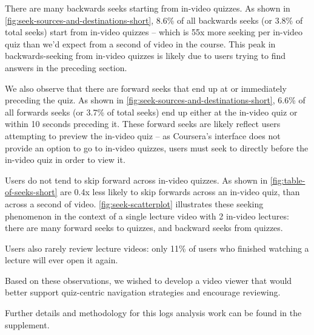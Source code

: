 \documentclass{sigchi}
\begin{document}
There are many backwards seeks starting from in-video quizzes. As shown in \autoref{fig:seek-sources-and-destinations-short}, 8.6\% of all backwards seeks (or 3.8\% of total seeks) start from in-video quizzes -- which is 55x more seeking per in-video quiz than we'd expect from a second of video in the course. This peak in backwards-seeking from in-video quizzes is likely due to users trying to find answers in the preceding section.

We also observe that there are forward seeks that end up at or immediately preceding the quiz. As shown in \autoref{fig:seek-sources-and-destinations-short}, 6.6\% of all forwards seeks (or 3.7\% of total seeks) end up either at the in-video quiz or within 10 seconds preceding it. These forward seeks are likely reflect users attempting to preview the in-video quiz -- as Coursera's interface does not provide an option to go to in-video quizzes, users must seek to directly before the in-video quiz in order to view it.

Users do not tend to skip forward across in-video quizzes. As shown in \autoref{fig:table-of-seeks-short} are 0.4x less likely to skip forwards across an in-video quiz, than across a second of video. \autoref{fig:seek-scatterplot} illustrates these seeking phenomenon in the context of a single lecture video with 2 in-video lectures: there are many forward seeks to quizzes, and backward seeks from quizzes.

Users also rarely review lecture videos: only 11\% of users who finished watching a lecture will ever open it again.

Based on these observations, we wished to develop a video viewer that would better support quiz-centric navigation strategies and encourage reviewing.

Further details and methodology for this logs analysis work can be found in the supplement.

\end{document}
